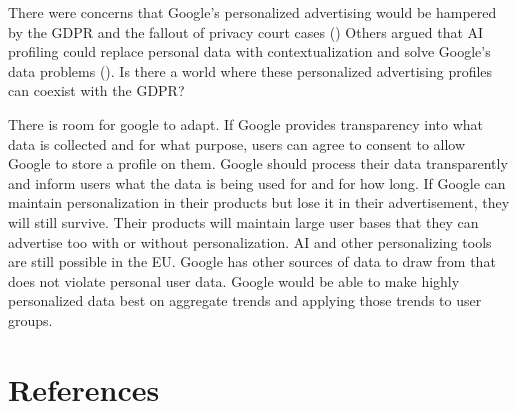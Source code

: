 \documentclass[
	letterpaper, %
]{jdf}
\begin{document}
There were concerns that Google's personalized advertising would be hampered by the GDPR and the fallout of privacy court cases (\cite{barry_gdpr_2019}) Others argued that AI profiling could replace personal data with contextualization and solve Google's data problems (\cite{davies_personalization_2018}). Is there a world where these personalized advertising profiles can coexist with the GDPR?  

There is room for google to adapt. If Google provides transparency into what data is collected and for what purpose, users can agree to consent to allow Google to store a profile on them. Google should process their data transparently and inform users what the data is being used for and for how long. If Google can maintain personalization in their products but lose it in their advertisement, they will still survive. Their products will maintain large user bases that they can advertise too with or without personalization. AI and other personalizing tools are still possible in the EU. Google has other sources of data to draw from that does not violate personal user data. Google would be able to make highly personalized data best on aggregate trends and applying those trends to user groups. 

\section{References}
\printbibliography[heading=none]
\end{document}
